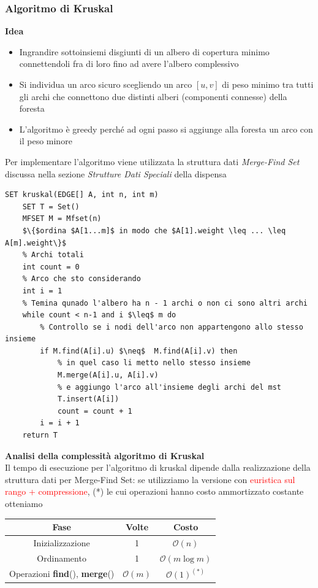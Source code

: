 \documentclass[../cheatSheetAlgoritmi.tex]{subfiles}
\begin{document}
\subsubsection{Algoritmo di Kruskal}
\textbf{Idea}
\begin{itemize}
	\item Ingrandire sottoinsiemi disgiunti di un albero di copertura minimo connettendoli fra di loro fino ad avere l’albero complessivo
	\item Si individua un arco sicuro scegliendo un arco $[u, v]$ di peso minimo tra tutti gli archi che connettono due distinti alberi (componenti connesse) della foresta
	\item L’algoritmo è greedy perché ad ogni passo si aggiunge alla foresta un arco con il peso minore
\end{itemize}
Per implementare l'algoritmo viene utilizzata la struttura dati \emph{Merge-Find Set} discussa nella sezione \emph{Strutture Dati Speciali} della dispensa
\begin{lstlisting}[caption=Albero di Copertura di Peso Minimo - Kruskal]
SET kruskal(EDGE[] A, int n, int m)
	SET T = Set()
	MFSET M = Mfset(n)
	$\{$ordina $A[1...m]$ in modo che $A[1].weight \leq ... \leq A[m].weight\}$
	% Archi totali
	int count = 0
	% Arco che sto considerando
	int i = 1
	% Temina qunado l'albero ha n - 1 archi o non ci sono altri archi
	while count < n-1 and i $\leq$ m do
		% Controllo se i nodi dell'arco non appartengono allo stesso insieme
		if M.find(A[i].u) $\neq$  M.find(A[i].v) then
			% in quel caso li metto nello stesso insieme
			M.merge(A[i].u, A[i].v)
			% e aggiungo l'arco all'insieme degli archi del mst
			T.insert(A[i])
			count = count + 1
		i = i + 1
	return T
\end{lstlisting}
\textbf{Analisi della complessità algoritmo di Kruskal}\\
Il tempo di esecuzione per l'algoritmo di kruskal dipende dalla realizzazione della struttura dati per Merge-Find Set: se utilizziamo la versione con \textcolor{red}{euristica sul rango + compressione}, (*) le cui operazioni hanno costo ammortizzato costante otteniamo
\begin{center}
	\renewcommand{\arraystretch}{1.2}
	\begin{tabular}{ |c|c|c| } 
		\hline
			\textbf{Fase} & \textbf{Volte} & \textbf{Costo}\\ 
		\hline
			Inizializzazione & 1 &  $\mathcal{O}(n)$\\ 
		\hline
			Ordinamento & 1 &  $\mathcal{O}(m \log m)$ \\
		\hline
			Operazioni \textbf{find}(), \textbf{merge}() & $\mathcal{O}(m)$ & $\mathcal{O}(1)^{(*)}$\\
		\hline
	\end{tabular}
\end{center}
\end{document}
